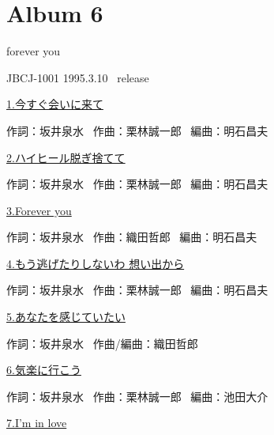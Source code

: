 
\chapter{Album 6}
\thispagestyle{empty} %
\vspace{-16mm}
\LARGE {forever you}

\normalsize{JBCJ-1001 1995.3.10 \ release}
\\

\vspace{-5mm}


\small{\hyperlink{6_0}{1.今すぐ会いに来て}}

\tiny{作詞：坂井泉水 \ 作曲：栗林誠一郎 \ 編曲：明石昌夫}

\small{\hyperlink{6_1}{2.ハイヒール脱ぎ捨てて}}

\tiny{作詞：坂井泉水 \ 作曲：栗林誠一郎 \ 編曲：明石昌夫}

\small{\hyperlink{6_2}{3.Forever you}}

\tiny{作詞：坂井泉水 \ 作曲：織田哲郎 \ 編曲：明石昌夫}

\small{\hyperlink{6_3}{4.もう逃げたりしないわ 想い出から}}

\tiny{作詞：坂井泉水 \ 作曲：栗林誠一郎 \ 編曲：明石昌夫}

\small{\hyperlink{6_4}{5.あなたを感じていたい}}

\tiny{作詞：坂井泉水 \ 作曲/編曲：織田哲郎}

\small{\hyperlink{6_5}{6.気楽に行こう}}

\tiny{作詞：坂井泉水 \ 作曲：栗林誠一郎 \ 編曲：池田大介}

\small{\hyperlink{6_6}{7.I'm in love}}


